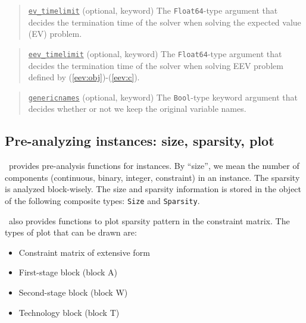 \begin{quote}
	\noindent\underline{\texttt{ev\_timelimit}} (optional, keyword) The \texttt{Float64}-type argument that decides the termination time of the solver when solving the expected value (EV) problem.
\end{quote}

\begin{quote}
	\noindent\underline{\texttt{eev\_timelimit}} (optional, keyword) The \texttt{Float64}-type argument that decides the termination time of the solver when solving EEV problem defined by (\ref{eev:obj})-(\ref{eev:c}).
\end{quote}

\begin{quote}
	\noindent\underline{\texttt{genericnames}} (optional, keyword) The \texttt{Bool}-type keyword argument that decides whether or not we keep the original variable names. 
\end{quote}

\subsection{Pre-analyzing instances: size, sparsity, plot} \label{tutorial:analyze_instance}
\siplibjl\ provides pre-analysis functions for instances. By ``size'', we mean the number of components (continuous, binary, integer, constraint) in an instance. The sparsity is analyzed block-wisely. The size and sparsity information is stored in the object of the following composite types: \texttt{Size} and \texttt{Sparsity}.

\siplibjl\ also provides functions to plot sparsity pattern in the constraint matrix. The types of plot that can be drawn are:
\begin{itemize}
	\item Constraint matrix of extensive form
	\item First-stage block (block A)
	\item Second-stage block (block W)
	\item Technology block (block T)
\end{itemize}


